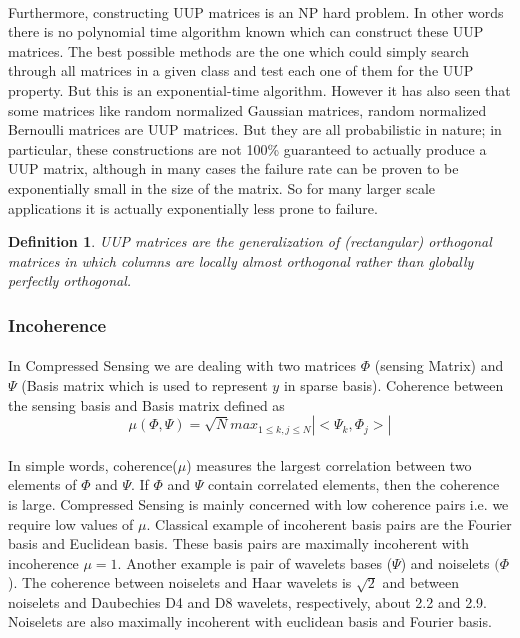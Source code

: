 \paragraph{}Furthermore, constructing UUP matrices is an NP hard problem. In other words there is no polynomial 
time algorithm known which can construct these UUP matrices. The best possible methods are the one which could simply
search through all matrices in a given class and test each one of them for the UUP property. But this is an exponential-time
algorithm. However it has also seen that some matrices like random normalized Gaussian matrices, random normalized Bernoulli matrices are
UUP matrices. But they are all probabilistic in nature; in particular, these constructions are not 100\% guaranteed to actually produce
a UUP matrix, although in many cases the failure rate can be proven to be exponentially small in the size of the matrix. 
So for many larger scale applications it is actually exponentially less prone to failure.

\newtheorem*{mydefo}{Definition}
\begin{mydefo}
UUP matrices are the generalization of (rectangular) orthogonal matrices in which columns are locally 
almost orthogonal rather than globally perfectly orthogonal.
\end{mydefo}

\subsubsection{Incoherence}

\paragraph{}In Compressed Sensing we are dealing with two matrices $\Phi$ (sensing Matrix)
and $\Psi$ (Basis matrix which is used to represent $y$ in sparse basis). Coherence between the sensing
basis and Basis matrix defined as 
\begin{equation}
\mu(\Phi,\Psi) = \sqrt{N} max_{1\leq k, j\leq N} |<\Psi_k,\Phi_j>|
\end{equation}
\paragraph{}In simple words, coherence($\mu$) measures the largest correlation between two elements of $\Phi$ and $\Psi$. If
$\Phi$ and $\Psi$ contain correlated elements, then the coherence is large. Compressed Sensing is mainly concerned with
low coherence pairs i.e. we require low values of $\mu$. Classical example of incoherent basis pairs are the Fourier basis 
and Euclidean basis. These basis pairs are maximally incoherent with incoherence $\mu = 1$. Another example is pair of 
wavelets bases ($\Psi$) and noiselets $(\Phi$). The coherence between noiselets and Haar wavelets is $\sqrt{2}$ and 
between noiselets and Daubechies D4 and D8 wavelets, respectively, about 2.2 and 2.9. Noiselets are also maximally incoherent
 with euclidean basis and Fourier basis.

